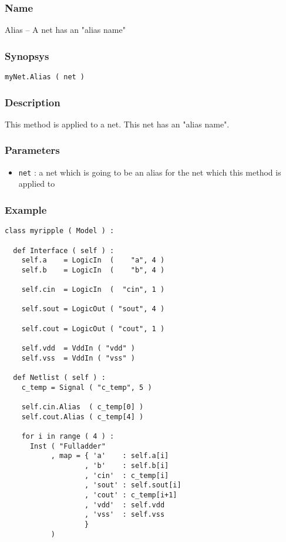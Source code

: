 \subsubsection{Name}
    Alias -- A net has an "alias name"

\subsubsection{Synopsys}

\verb-myNet.Alias ( net )-

\subsubsection{Description}

This method is applied to a net. This net has an "alias name".

\subsubsection{Parameters}

\begin{itemize}
    \item \verb-net- : a net which is going to be an alias for the net which this method is applied to
\end{itemize}

\subsubsection{Example}

\begin{verbatim}
class myripple ( Model ) :
    
  def Interface ( self ) :
    self.a    = LogicIn  (    "a", 4 )
    self.b    = LogicIn  (    "b", 4 )

    self.cin  = LogicIn  (  "cin", 1 )

    self.sout = LogicOut ( "sout", 4 )

    self.cout = LogicOut ( "cout", 1 )

    self.vdd  = VddIn ( "vdd" )
    self.vss  = VddIn ( "vss" )

  def Netlist ( self ) :
    c_temp = Signal ( "c_temp", 5 )
    
    self.cin.Alias  ( c_temp[0] )
    self.cout.Alias ( c_temp[4] )
          
    for i in range ( 4 ) :
      Inst ( "Fulladder"
           , map = { 'a'    : self.a[i]
                   , 'b'    : self.b[i]
                   , 'cin'  : c_temp[i]
                   , 'sout' : self.sout[i]
                   , 'cout' : c_temp[i+1]
                   , 'vdd'  : self.vdd
                   , 'vss'  : self.vss
                   }
           )
\end{verbatim}

